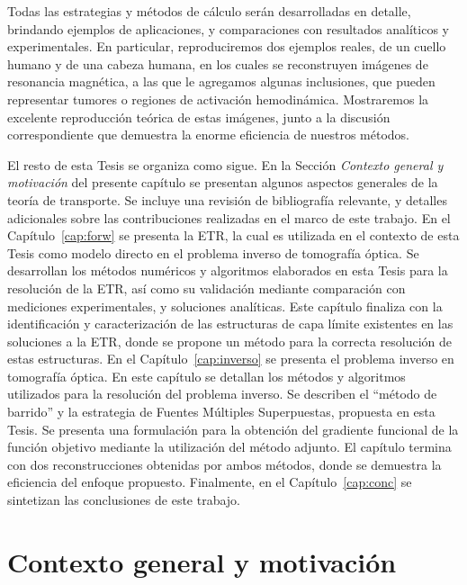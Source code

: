 Todas las estrategias y métodos de cálculo serán desarrolladas 
en detalle, brindando ejemplos de aplicaciones, y comparaciones 
con resultados analíticos y experimentales. 
En particular, reproduciremos dos ejemplos reales, de un cuello 
humano y de una cabeza humana, en los 
cuales se reconstruyen imágenes de resonancia magnética, a las 
que le agregamos algunas inclusiones, que pueden representar 
tumores o regiones de activación hemodinámica.
Mostraremos la excelente reproducción teórica de estas imágenes, 
junto a la discusión correspondiente que demuestra la enorme 
eficiencia de nuestros métodos.

El resto de esta Tesis se organiza como sigue. 
En la Sección {\em Contexto general y motivación} del presente capítulo 
se presentan algunos aspectos 
generales de la teoría de transporte. Se incluye
 una revisión de bibliografía relevante, 
y detalles adicionales sobre las contribuciones realizadas en el marco de este trabajo.
En el Capítulo~\ref{cap:forw} se presenta 
la ETR, la cual es utilizada en el contexto 
de esta Tesis como modelo directo 
en el problema inverso de tomografía óptica. Se desarrollan 
los métodos numéricos y algoritmos elaborados en esta Tesis 
para la resolución de la ETR, así como su validación 
mediante comparación con mediciones experimentales, y soluciones analíticas. Este capítulo finaliza con la identificación y 
caracterización de las estructuras de capa límite existentes 
en las soluciones a la ETR, donde se propone un método para 
la correcta resolución de estas estructuras. 
En el Capítulo~\ref{cap:inverso} se presenta el problema inverso 
en tomografía óptica. En este capítulo se detallan los métodos 
y algoritmos utilizados para la resolución del problema inverso. 
Se describen el ``método de barrido'' y la estrategia de Fuentes Múltiples Superpuestas, propuesta en esta Tesis. 
Se presenta una formulación para la obtención del gradiente 
funcional de la función objetivo mediante la utilización del método adjunto. El capítulo termina con dos 
reconstrucciones obtenidas por ambos métodos, donde se demuestra 
la eficiencia del enfoque propuesto. Finalmente, en el Capítulo~\ref{cap:conc} se sintetizan las conclusiones de este trabajo.


\bigskip
\section{Contexto general y motivación}

